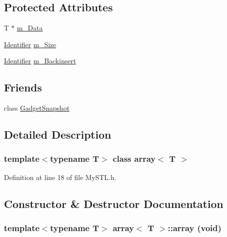 \subsection*{Protected Attributes}
\begin{DoxyCompactItemize}
\item 
T $\ast$ \hyperlink{classarray_a6b46d7af0bacf9258f5e8e46b2e42f28}{m\_\-Data}
\item 
\hyperlink{Vector3_8h_a25e0b8ddd193bb84ebf6c0eeff6b1c82}{Identifier} \hyperlink{classarray_a9d61b9e3d5ef2caa0aab628414b26d3a}{m\_\-Size}
\item 
\hyperlink{Vector3_8h_a25e0b8ddd193bb84ebf6c0eeff6b1c82}{Identifier} \hyperlink{classarray_a0424dba081ebfef3032425bad0595d06}{m\_\-Backinsert}
\end{DoxyCompactItemize}
\subsection*{Friends}
\begin{DoxyCompactItemize}
\item 
class \hyperlink{classarray_a4af7d5c42d512b86461b9b927c143c22}{GadgetSnapshot}
\end{DoxyCompactItemize}


\subsection{Detailed Description}
\subsubsection*{template$<$typename T$>$ class array$<$ T $>$}



Definition at line 18 of file MySTL.h.



\subsection{Constructor \& Destructor Documentation}
\subsubsection[{array}]{\setlength{\rightskip}{0pt plus 5cm}template$<$typename T$>$ {\bf array}$<$ T $>$::{\bf array} (void)}\label{classarray_a820c25094aa9a4c0062940cb7f77c007}


